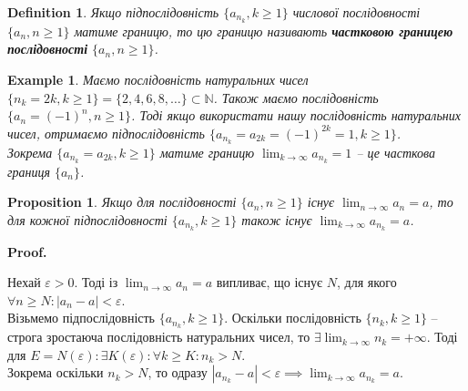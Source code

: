 \documentclass[a4paper, 14pt]{article}
\makeatletter
\def\qed{$\blacksquare$}
\theoremstyle{theoremdd}
\theoremstyle{theoremdd}
\newtheorem{definition}[theorem]{Definition}
\theoremstyle{theoremdd}
\theoremstyle{theoremdd}
\newtheorem{example}[theorem]{Example}
\theoremstyle{theoremdd}
\newtheorem{proposition}[theorem]{Proposition}
\theoremstyle{theoremdd}
\theoremstyle{theoremdd}
\theoremstyle{theoremdd}
\renewenvironment{proof}[1][Proof.\\]{\par
\pushQED{\hfill \qed}%
\normalfont \topsep6\p@\@plus6\p@\relax
\trivlist
\item\relax
{\bfseries
#1\@addpunct{.}}\hspace\labelsep\ignorespaces
}{%
\popQED\endtrivlist\@endpefalse
}
\makeatother
\begin{document}
	\begin{definition}
	Якщо підпослідовність $\{a_{n_k}, k \geq 1\}$ числової послідовності $\{a_n, n \geq 1\}$ матиме границю, то цю границю називають \textbf{частковою границею послідовності} $\{a_n, n \geq 1\}$.
	\end{definition}
	
	\begin{example} Маємо послідовність натуральних чисел
	$\{n_k = 2k, k \geq 1 \} = \{2,4,6,8,\dots \} \subset \mathbb{N}$.
	Також маємо послідовність $\{a_n = (-1)^n, n \geq 1\}$. Тоді якщо використати нашу послідовність натуральних чисел, отримаємо підпослідовність $\{a_{n_k} = a_{2k} = (-1)^{2k} = 1, k \geq 1\}$.\\
	Зокрема $\{a_{n_k} = a_{2k}, k \geq 1\}$ матиме границю $\displaystyle\lim_{k \to \infty} a_{n_k} = 1$ -- це часткова границя $\{a_n\}$.
	\end{example}
	
	\begin{proposition}
	Якщо для послідовності $\{a_n, n \geq 1\}$ існує $\displaystyle \lim_{n \to \infty} a_n = a$, то для кожної підпослідовності $\displaystyle \{a_{n_k}, k \geq 1\}$ також існує $\displaystyle\lim_{k \to \infty} a_{n_k} = a$.
	\end{proposition}
	
	\begin{proof}
	Нехай $\varepsilon > 0$. Тоді із $\displaystyle\lim_{n \to \infty} a_n = a$ випливає, що існує $N$, для якого $\forall n \geq N: |a_n-a| < \varepsilon$.\\
	Візьмемо підпослідовність $\{a_{n_k}, k \geq 1\}$. Оскільки послідовність $\{n_k, k \geq 1\}$ -- строга зростаюча послідовність натуральних чисел, то $\exists \displaystyle \lim_{k \to \infty} n_k = +\infty$. Тоді для $E = N(\varepsilon): \exists K(\varepsilon): \forall k \geq K: n_k > N$.\\
	Зокрема оскільки $n_k > N$, то одразу $|a_{n_k} - a| < \varepsilon \implies \displaystyle \lim_{k \to \infty} a_{n_k} = a$.
	\end{proof}
	

	
\end{document}
